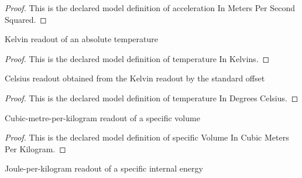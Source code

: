 \begin{proof}
  This is the declared model definition of acceleration In Meters Per Second Squared.
\end{proof}
\begin{definition}
  \label{def:physics:phyx-mini-0453:phyxminiproblems-problemphyxmini0453-temperatureinkelvins}
  Kelvin readout of an absolute temperature
\end{definition}
\begin{proof}
  This is the declared model definition of temperature In Kelvins.
\end{proof}
\begin{definition}
  \label{def:physics:phyx-mini-0453:phyxminiproblems-problemphyxmini0453-temperatureindegreescelsius}
  Celsius readout obtained from the Kelvin readout by the standard offset
\end{definition}
\begin{proof}
  This is the declared model definition of temperature In Degrees Celsius.
\end{proof}
\begin{definition}
  \label{def:physics:phyx-mini-0453:phyxminiproblems-problemphyxmini0453-specificvolumeincubicmetersperkilogram}
  Cubic-metre-per-kilogram readout of a specific volume
\end{definition}
\begin{proof}
  This is the declared model definition of specific Volume In Cubic Meters Per Kilogram.
\end{proof}
\begin{definition}
  \label{def:physics:phyx-mini-0453:phyxminiproblems-problemphyxmini0453-specificenergyinjoulesperkilogram}
  Joule-per-kilogram readout of a specific internal energy
\end{definition}

